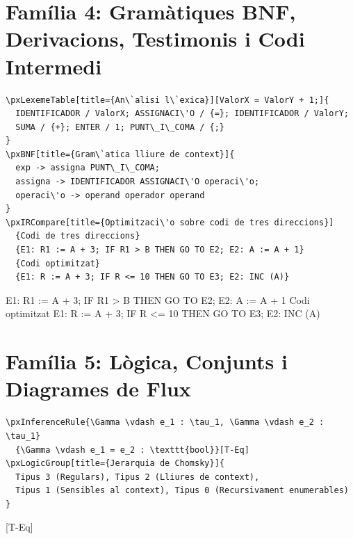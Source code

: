 \documentclass[11pt,a4paper]{article}
\begin{document}
\newpage
\section{Fam\'ilia 4: Gram\`atiques BNF, Derivacions, Testimonis i Codi Intermedi}

\begin{verbatim}
\pxLexemeTable[title={An\`alisi l\`exica}][ValorX = ValorY + 1;]{
  IDENTIFICADOR / ValorX; ASSIGNACI\'O / {=}; IDENTIFICADOR / ValorY;
  SUMA / {+}; ENTER / 1; PUNT\_I\_COMA / {;}
}
\pxBNF[title={Gram\`atica lliure de context}]{
  exp -> assigna PUNT\_I\_COMA;
  assigna -> IDENTIFICADOR ASSIGNACI\'O operaci\'o;
  operaci\'o -> operand operador operand
}
\pxIRCompare[title={Optimitzaci\'o sobre codi de tres direccions}]
  {Codi de tres direccions}
  {E1: R1 := A + 3; IF R1 > B THEN GO TO E2; E2: A := A + 1}
  {Codi optimitzat}
  {E1: R := A + 3; IF R <= 10 THEN GO TO E3; E2: INC (A)}
\end{verbatim}



  {E1: R1 := A + 3; IF R1 > B THEN GO TO E2; E2: A := A + 1}
  {Codi optimitzat}
  {E1: R := A + 3; IF R <= 10 THEN GO TO E3; E2: INC (A)}

\section{Fam\'ilia 5: L\`ogica, Conjunts i Diagrames de Flux}

\begin{verbatim}
\pxInferenceRule{\Gamma \vdash e_1 : \tau_1, \Gamma \vdash e_2 : \tau_1}
  {\Gamma \vdash e_1 = e_2 : \texttt{bool}}[T-Eq]
\pxLogicGroup[title={Jerarquia de Chomsky}]{
  Tipus 3 (Regulars), Tipus 2 (Lliures de context),
  Tipus 1 (Sensibles al context), Tipus 0 (Recursivament enumerables)
}
\end{verbatim}

[T-Eq]
\end{document}
